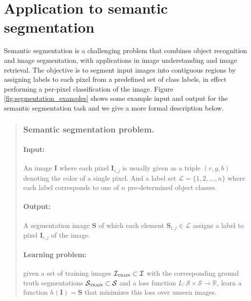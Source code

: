 \documentclass[a4paper,titlepage]{article}
\newcommand{\mat}[1]{\mathbf{#1}}
\begin{document}
%

\pagebreak
\section{Application to semantic segmentation}





Semantic segmentation is a challenging problem that combines object recognition and image segmentation, with applications in image understanding and image retrieval. The objective is to segment input images into contiguous regions by assigning labels to each pixel from a predefined set of class labels, in effect performing a per-pixel classification of the image. Figure \ref{fig:segmentation_examples} shows some example input and output for the semantic segmentation task and we give a more formal description below.

\begin{quotation}
\subsubsection*{Semantic segmentation problem.}

\paragraph{Input:} An image $\mat{I}$ where each pixel $\mat{I}_{i,j}$ is usually given as a triple $(r,g,b)$ denoting the color of a single pixel. And a label set $\mathcal{L} = \{1, 2, \ldots, n\}$ where each label corresponds to one of $n$ pre-determined object classes.

\paragraph{Output:} A segmentation image $\mat{S}$ of which each element  $\mat{S}_{i,j} \in \mathcal{L}$ assigns a label to pixel $\mat{I}_{i,j}$ of the image.

\paragraph{Learning problem:} given a set of training images $\mathcal{I}_\textsc{train} \subset \mathcal{I}$ with the corresponding ground truth segmentations $\mathcal{S}_\textsc{train} \subset \mathcal{S}$ and a loss function $L: \mathcal{S} \times \mathcal{S} \rightarrow \mathbb{R}$, learn a function $h(\mat{I}) = \mat{S}$ that minimizes this loss over unseen images. %
\end{quotation}
\end{document}
